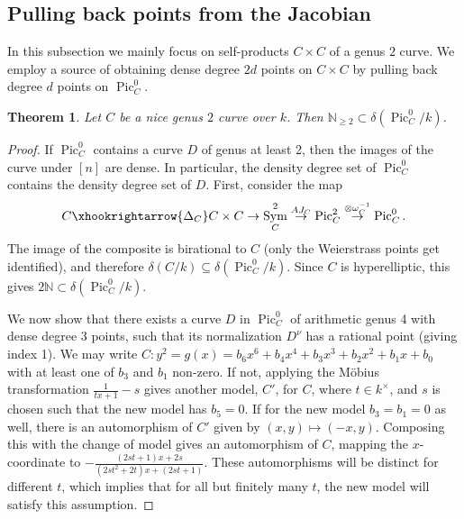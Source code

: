 \documentclass[a4paper,11pt]{amsart}
\theoremstyle{plain}
\newtheorem{thm}{Theorem}[section]
\theoremstyle{remark}
\DeclareMathOperator{\Sym}{Sym}
\newcommand{\nn}{\mathbb{N}}
\newcommand{\Pic}{\operatorname{Pic}}
\newcommand{\dendegs}{\delta}
\begin{document}
\subsection{Pulling back points from the Jacobian} In this subsection we mainly focus on self-products $C\times C$ of a genus $2$ curve. We employ a source of obtaining dense degree $2d$ points on $C\times C$ by pulling back degree $d$ points on $\Pic^0_C$. 
\begin{thm}\label{thm:Jac of genus 2} 
Let $C$ be a nice genus $2$ curve over $k$. 
Then $\nn_{\geq 2}\subset\dendegs(\Pic^0_C/k)$. 
\end{thm}
\begin{proof}
    If $\Pic^0_C$ contains a curve $D$ of genus at least 2, then the images of the curve under $[n]$ are dense. 
    In particular, the density degree set of $\Pic^0_C$ contains the density degree set of $D$. 
    First, consider the map 
    \[
        C\xhookrightarrow{\Delta_C} C\times C \to \Sym^2_C \overset{AJ_C}{\to} \Pic^2_C \overset{\otimes \omega_C^{-1}}{\to} \Pic^0_C.
    \]
    The image of the composite is birational to $C$ (only the Weierstrass points get identified), and therefore $\dendegs(C/k)\subseteq \dendegs(\Pic^0_C/k)$. Since $C$ is hyperelliptic, this gives $2\nn\subset \dendegs(\Pic^0_C/k)$.
    
    We now show that there exists a curve $D$ in $\Pic^0_C$ of arithmetic genus 4 with dense degree 3 points, such that its normalization $D^\nu$ has a rational point (giving index 1).
    We may write $C : y^2 = g(x) = b_6 x^6 + b_4 x^4 + b_3 x^3 + b_2 x^2 + b_1 x + b_0$ with at least one of $b_3$ and $b_1$ non-zero. 
    If not, applying the M\"obius transformation $\frac{1}{tx + 1} - s$ gives another model, $C'$, for $C$, where $t \in k^\times$, and $s$ is chosen such that the new model has $b_5 = 0$. If for the new model $b_3 = b_1 = 0$ as well, there is an automorphism of $C'$ given by $(x, y) \mapsto (-x, y)$. Composing this with the change of model gives an automorphism of $C$, mapping the $x$-coordinate to $-\frac{(2st + 1)x + 2s}{(2st^2 + 2t)x + (2st + 1)}$. These automorphisms will be distinct for different $t$, which implies that for all but finitely many $t$, the new model will satisfy this assumption.
    

\end{proof}
\end{document}
